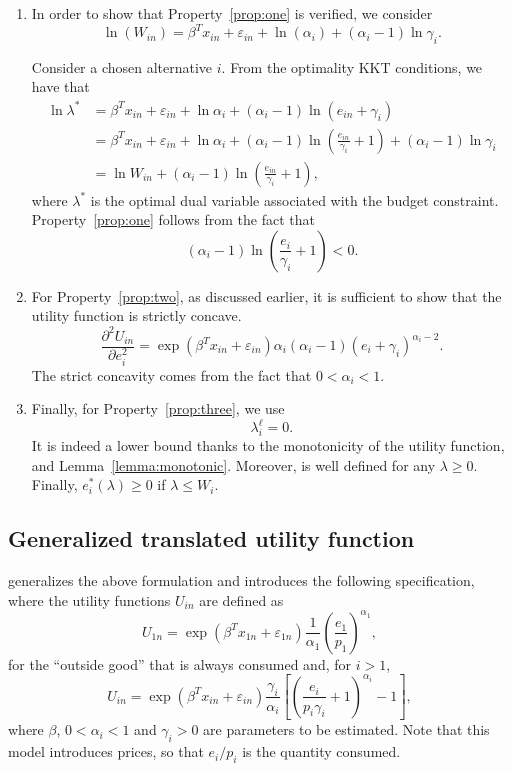 \documentclass[12pt,a4paper]{article}
\begin{document}
\begin{enumerate}

\item In order to show that Property~\ref{prop:one} is verified, we consider
\[
   \ln(W_{in})  =\beta^T x_{in} + \varepsilon_{in} +\ln(\alpha_i) + (\alpha_i-1) \ln \gamma_i.
\]

Consider a chosen alternative $i$. From the optimality KKT conditions, we have that
\begin{align*}
   \ln \lambda^* &= \beta^T x_{in}+ \varepsilon_{in} + \ln \alpha_i + (\alpha_i-1) \ln (e_{in} + \gamma_i) \\
    &= \beta^T x_{in}+ \varepsilon_{in} + \ln \alpha_i + (\alpha_i-1) \ln (\frac{e_{in}}{\gamma_i}+1) +  (\alpha_i-1) \ln \gamma_i \\
    &= \ln W_{in} +  (\alpha_i-1) \ln (\frac{e_{in}}{\gamma_i}+1),
\end{align*}
where $\lambda^*$ is the optimal dual variable associated with the budget constraint.
Property~\ref{prop:one} follows from the fact that
\[
   (\alpha_i-1) \ln (\frac{e_i}{\gamma_i}+1) < 0.
\]


\item For Property~\ref{prop:two}, as discussed earlier, it is sufficient to show that the utility function is strictly concave.
\[
    \frac{\partial^2 U_{in}}{\partial e_i^2} = \exp(\beta^T x_{in} + \varepsilon_{in})\alpha_i(\alpha_i-1)(e_i + \gamma_i)^{\alpha_i-2}.
\]
The strict concavity comes from the fact that $0 <\alpha_i < 1$.
\item Finally, for Property~\ref{prop:three}, we use \[
              \lambda^\ell_i = 0.
\]
 It is indeed a lower bound thanks to the monotonicity
of the utility function, and Lemma~\ref{lemma:monotonic}. Moreover,
 is well defined for any $\lambda \geq 0$. Finally,
    $e_i^*(\lambda) \geq 0$ if $\lambda \leq W_i$.


\end{enumerate}
\subsection{Generalized translated utility function}

 generalizes the above formulation and introduces the following specification, where the utility functions $U_{in}$ are defined as
\begin{equation}
  \label{eq:generalized_utility_outside}
U_{1n} =\exp(\beta^T x_{1n} + \varepsilon_{1n}) \frac{1}{\alpha_1} \left(\frac{e_1}{p_1}\right)^{\alpha_1},
\end{equation}
for the ``outside good'' that is always consumed and, for $i > 1$,
\begin{equation}
  \label{eq:generalized_utility}
U_{in} =\exp(\beta^T x_{in} + \varepsilon_{in}) \frac{\gamma_i}{\alpha_i} \left[\left(\frac{e_i}{p_i \gamma_i}+1\right)^{\alpha_i}-1\right],
\end{equation}
where $\beta$, $0 < \alpha_i < 1$ and $\gamma_i > 0$ are parameters to be
estimated. Note that this model introduces prices, so that $e_i/p_i$ is the quantity consumed.
\end{document}
